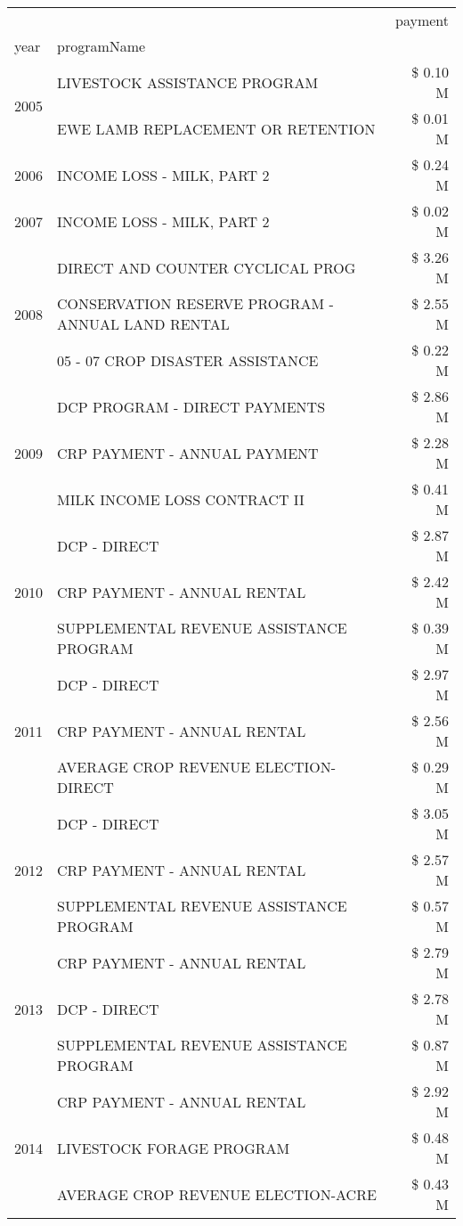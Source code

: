 \begin{tabular}{llr}
\toprule
 &  & payment \\
year & programName &  \\
\midrule
\multirow[t]{2}{*}{2005} & LIVESTOCK ASSISTANCE PROGRAM & \$ 0.10 M \\
 & EWE LAMB REPLACEMENT OR RETENTION & \$ 0.01 M \\
\cline{1-3}
2006 & INCOME LOSS - MILK, PART 2 & \$ 0.24 M \\
\cline{1-3}
2007 & INCOME LOSS - MILK, PART 2 & \$ 0.02 M \\
\cline{1-3}
\multirow[t]{3}{*}{2008} & DIRECT AND COUNTER CYCLICAL PROG & \$ 3.26 M \\
 & CONSERVATION RESERVE PROGRAM - ANNUAL LAND RENTAL & \$ 2.55 M \\
 & 05 - 07 CROP DISASTER ASSISTANCE & \$ 0.22 M \\
\cline{1-3}
\multirow[t]{3}{*}{2009} & DCP PROGRAM - DIRECT PAYMENTS & \$ 2.86 M \\
 & CRP PAYMENT - ANNUAL PAYMENT & \$ 2.28 M \\
 & MILK INCOME LOSS CONTRACT II & \$ 0.41 M \\
\cline{1-3}
\multirow[t]{3}{*}{2010} & DCP - DIRECT & \$ 2.87 M \\
 & CRP PAYMENT - ANNUAL RENTAL & \$ 2.42 M \\
 & SUPPLEMENTAL REVENUE ASSISTANCE PROGRAM & \$ 0.39 M \\
\cline{1-3}
\multirow[t]{3}{*}{2011} & DCP - DIRECT & \$ 2.97 M \\
 & CRP PAYMENT - ANNUAL RENTAL & \$ 2.56 M \\
 & AVERAGE CROP REVENUE ELECTION-DIRECT & \$ 0.29 M \\
\cline{1-3}
\multirow[t]{3}{*}{2012} & DCP - DIRECT & \$ 3.05 M \\
 & CRP PAYMENT - ANNUAL RENTAL & \$ 2.57 M \\
 & SUPPLEMENTAL REVENUE ASSISTANCE PROGRAM & \$ 0.57 M \\
\cline{1-3}
\multirow[t]{3}{*}{2013} & CRP PAYMENT - ANNUAL RENTAL & \$ 2.79 M \\
 & DCP - DIRECT & \$ 2.78 M \\
 & SUPPLEMENTAL REVENUE ASSISTANCE PROGRAM & \$ 0.87 M \\
\cline{1-3}
\multirow[t]{3}{*}{2014} & CRP PAYMENT - ANNUAL RENTAL & \$ 2.92 M \\
 & LIVESTOCK FORAGE PROGRAM & \$ 0.48 M \\
 & AVERAGE CROP REVENUE ELECTION-ACRE & \$ 0.43 M \\

\end{tabular}
